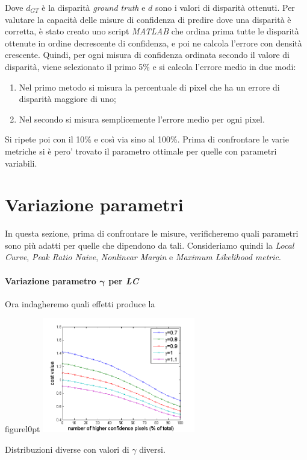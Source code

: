 \documentclass[12pt]{report}
\begin{document}
		\noindent Dove $d_{GT}$ è la disparità \textit{ground truth} e $d$ sono i valori di disparità ottenuti. \newline Per valutare la capacità delle misure di confidenza di predire dove una disparità è corretta, è stato creato uno script \textit{MATLAB} che ordina prima tutte le disparità ottenute in ordine decrescente di confidenza, e poi ne calcola l'errore con densità crescente. Quindi, per ogni misura di confidenza ordinata secondo il valore di disparità, viene selezionato il primo 5\% e si calcola l'errore medio in due modi:  
		
		\begin{enumerate}
			\item Nel primo metodo si misura la percentuale di pixel che ha un errore di disparità maggiore di uno;
			
			\item Nel secondo si misura semplicemente l'errore medio per ogni pixel.
			\label{enum:errore}
		\end{enumerate}
				
		\noindent Si ripete poi con il 10\% e così via sino al 100\%. Prima di confrontare le varie metriche si è pero' trovato il parametro ottimale per quelle con parametri variabili.
		
		\section{Variazione parametri}
		\label{sec:parametri}
		
			In questa sezione, prima di confrontare le misure, verificheremo quali parametri sono più adatti per quelle che dipendono da tali. Consideriamo quindi la \textit{Local Curve}, \textit{Peak Ratio Naive}, \textit{Nonlinear Margin}  e \textit{Maximum Likelihood metric}.
		
			\paragraph{Variazione parametro $\bm{\gamma}$ per \textit{LC}}
			\label{par:gamma}
		
				Ora indagheremo quali effetti produce la 
		
		
				\begin{wrapfloat}{figure}{l}{0pt}
					\includegraphics[width=0.5\textwidth]{./figures/gamma_LC.png}
					\caption{Distribuzioni diverse con valori di $\gamma$ diversi.}
					\label{fig:gammaLC}
				\end{wrapfloat} 
		
\end{document}

